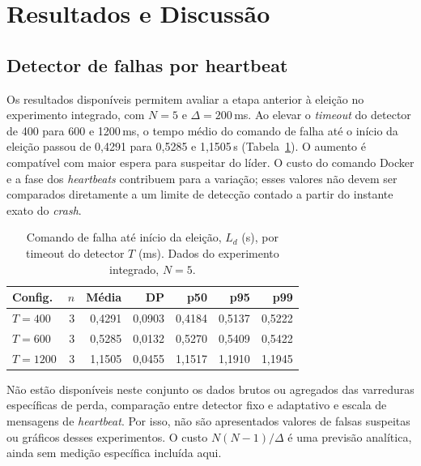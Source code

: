 \documentclass[conference]{IEEEtran}
\begin{document}
\section{Resultados e Discussão}
\label{sec:resultados}

\subsection{Detector de falhas por heartbeat}
\label{sec:res-hb}

Os resultados disponíveis permitem avaliar a etapa anterior à eleição no experimento integrado, com $N=5$ e $\Delta=200$\,ms. Ao elevar o \textit{timeout} do detector de 400 para 600 e 1200\,ms, o tempo médio do comando de falha até o início da eleição passou de 0,4291 para 0,5285 e 1,1505\,s (Tabela~\ref{tab:res-hb}). O aumento é compatível com maior espera para suspeitar do líder. O custo do comando Docker e a fase dos \textit{heartbeats} contribuem para a variação; esses valores não devem ser comparados diretamente a um limite de detecção contado a partir do instante exato do \textit{crash}.

\begin{table}[t]
\centering
\caption{Comando de falha até início da eleição, $L_d$ (s), por timeout do detector $T$ (ms). Dados do experimento integrado, $N=5$.}
\label{tab:res-hb}
\footnotesize
\begin{tabular}{lrrrrrr}
\toprule
\textbf{Config.} & $n$ & \textbf{Média} & \textbf{DP} & \textbf{p50} & \textbf{p95} & \textbf{p99} \\
\midrule
$T=400$ & 3 & 0,4291 & 0,0903 & 0,4184 & 0,5137 & 0,5222 \\
$T=600$ & 3 & 0,5285 & 0,0132 & 0,5270 & 0,5409 & 0,5422 \\
$T=1200$ & 3 & 1,1505 & 0,0455 & 1,1517 & 1,1910 & 1,1945 \\
\bottomrule
\end{tabular}
\end{table}

Não estão disponíveis neste conjunto os dados brutos ou agregados das varreduras específicas de perda, comparação entre detector fixo e adaptativo e escala de mensagens de \textit{heartbeat}. Por isso, não são apresentados valores de falsas suspeitas ou gráficos desses experimentos. O custo $N(N-1)/\Delta$ é uma previsão analítica, ainda sem medição específica incluída aqui.
\end{document}
